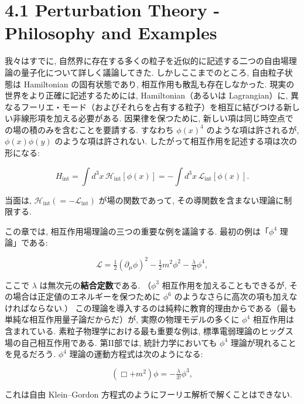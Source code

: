 \documentclass[a4paper,12pt]{article}
\begin{document}
\newpage
\color{black}
\section*{4.1 Perturbation Theory - Philosophy and Examples}
我々はすでに, 自然界に存在する多くの粒子を近似的に記述する二つの自由場理論の量子化について詳しく議論してきた. 
しかしここまでのところ, 自由粒子状態は Hamiltonian の固有状態であり, 相互作用も散乱も存在しなかった. 
現実の世界をより正確に記述するためには, Hamiltonian（あるいは Lagrangian）に, 
異なるフーリエ・モード（およびそれらを占有する粒子）を相互に結びつける新しい非線形項を加える必要がある. 
因果律を保つために, 新しい項は同じ時空点での場の積のみを含むことを要請する. 
すなわち $\phi(x)^4$ のような項は許されるが, $\phi(x)\phi(y)$ のような項は許されない. 
したがって相互作用を記述する項は次の形になる:

\begin{equation*}
H_{\text{int}} = \int d^3x \, \mathcal{H}_{\text{int}}[\phi(x)] 
= - \int d^3x \, \mathcal{L}_{\text{int}}[\phi(x)] .
\end{equation*}

当面は, $\mathcal{H}_{\text{int}} (= -\mathcal{L}_{\text{int}})$ が場の関数であって, その導関数を含まない理論に制限する.

この章では, 相互作用場理論の三つの重要な例を議論する. 
最初の例は「$\phi^4$ 理論」である:

\begin{equation*}
\mathcal{L} = \tfrac{1}{2} (\partial_\mu \phi)^2 - \tfrac{1}{2} m^2 \phi^2 - \tfrac{\lambda}{4!}\phi^4 ,
\end{equation*}

ここで $\lambda$ は無次元の\textbf{結合定数}である. 
（$\phi^3$ 相互作用を加えることもできるが, その場合は正定値のエネルギーを保つために $\phi^6$ のようなさらに高次の項も加えなければならない.） 
この理論を導入するのは純粋に教育的理由からである（最も単純な相互作用量子論だからだ）が, 
実際の物理モデルの多くに $\phi^4$ 相互作用は含まれている. 
素粒子物理学における最も重要な例は, 標準電弱理論のヒッグス場の自己相互作用である. 
第II部では, 統計力学においても $\phi^4$ 理論が現れることを見るだろう. 
$\phi^4$ 理論の運動方程式は次のようになる:

\begin{equation*}
(\Box + m^2)\phi = - \tfrac{\lambda}{3!} \phi^3 ,
\end{equation*}

これは自由 Klein--Gordon 方程式のようにフーリエ解析で解くことはできない.
\end{document}
